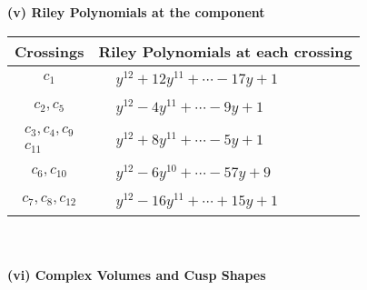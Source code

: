 \documentclass[1p]{elsarticle_modified}
\theoremstyle{definition}
\begin{document}
\newpage\renewcommand{\arraystretch}{1}
\flushleft \textbf{(v) Riley Polynomials at the component}\newline \\
\begin{tabular}{m{50pt}|m{274pt}}
Crossings & \hspace{64pt}Riley Polynomials at each crossing \\
\hline $$\begin{aligned}c_{1}\end{aligned}$$&$\begin{aligned}
&y^{12}+12 y^{11}+\cdots-17 y+1
\end{aligned}$\\
\hline $$\begin{aligned}c_{2},c_{5}\end{aligned}$$&$\begin{aligned}
&y^{12}-4 y^{11}+\cdots-9 y+1
\end{aligned}$\\
\hline $$\begin{aligned}c_{3},c_{4},c_{9}\\c_{11}\end{aligned}$$&$\begin{aligned}
&y^{12}+8 y^{11}+\cdots-5 y+1
\end{aligned}$\\
\hline $$\begin{aligned}c_{6},c_{10}\end{aligned}$$&$\begin{aligned}
&y^{12}-6 y^{10}+\cdots-57 y+9
\end{aligned}$\\
\hline $$\begin{aligned}c_{7},c_{8},c_{12}\end{aligned}$$&$\begin{aligned}
&y^{12}-16 y^{11}+\cdots+15 y+1
\end{aligned}$\\
\hline
\end{tabular}\\~\\
\newpage\flushleft \textbf{(vi) Complex Volumes and Cusp Shapes}
\end{document}
